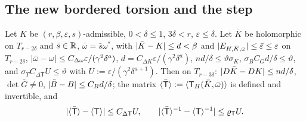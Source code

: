 \subsection{The new bordered torsion and the step}\label{bpI:p2s:sec-step}

\begin{lemma}\label{bpI:p2s:twist}
Let $K$ be $(r,\beta,\varepsilon,s)$-admissible, $0<\delta\le1$, $3\delta<r$, $\varepsilon\le\delta$. Let $\bar K$ be holomorphic on $T_{r-2\delta}$ and $\bar s\in\mathbb{R}$,
$\bar\omega=\bar s\omega^*$, with $\lvert \bar K-K\rvert\le d<\beta$ and $\lvert E_{H,\bar K,\bar\omega}\rvert\le\bar\varepsilon\le\varepsilon$ on $T_{r-2\delta}$,
$\lvert \bar\omega-\omega\rvert\le C_{\Delta\omega}\varepsilon/(\gamma^2\delta^a)$, $d=C_{\Delta K}\varepsilon/(\gamma^2\delta^a)$, $nd/\delta\le\vartheta\sigma_K$,
$\sigma_BC_Gd/\delta\le\vartheta$, and $\sigma_TC_{\Delta\mathsf T}U\le\vartheta$ with $U:=\varepsilon/(\gamma^2\delta^{a+1})$. Then on $T_{r-3\delta}$:
$\lvert D\bar K-DK\rvert\le nd/\delta$, $\det\bar G\ne0$, $\lvert \bar B-B\rvert\le C_Bd/\delta$; the matrix $\langle \bar{\mathsf T}\rangle:=\langle \mathsf T_H(\bar K,\bar\omega)\rangle$ is defined and
invertible, and
\[
\lvert \langle \bar{\mathsf T}\rangle-\langle \mathsf T\rangle\rvert\le C_{\Delta\mathsf T}U,\qquad\lvert \langle \bar{\mathsf T}\rangle^{-1}-\langle \mathsf T\rangle^{-1}\rvert\le\varrho_{\mathsf T}U.
\]
\end{lemma}

